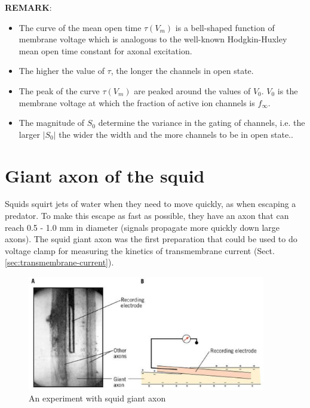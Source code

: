 {\bf REMARK}:
\begin{itemize}

\item The curve of the mean open time $\tau(V_m)$ is a bell-shaped
  function of membrane voltage which is analogous to the well-known
  Hodgkin-Huxley mean open time constant for axonal excitation.

\item The higher the value of $\tau$, the longer the channels in open
  state.

\item The peak of the curve $\tau(V_m)$ are peaked around the values
  of $V_0$. $V_0$ is the membrane voltage at which the fraction of
  active ion channels is $f_\infty$.

\item The magnitude of $S_0$ determine the variance in the gating of
  channels, i.e. the larger $|S_0|$ the wider the width and the more
  channels to be in open state..
\end{itemize}

\section{Giant axon of the squid}
\label{sec:squid-giant-axon}

Squids squirt jets of water when they need to move quickly, as when escaping a
predator. To make this escape as fast as possible, they have an axon that can
reach 0.5 - 1.0 mm in diameter (signals propagate more quickly down large
axons). The squid giant axon was the first preparation that could be used to
do voltage clamp for measuring the kinetics of transmembrane current
(Sect.\ref{sec:transmembrane-current}).


\begin{figure}[hbt]
  \centerline{\includegraphics[height=5cm,
    angle=0]{./images/giant_axon.eps}}
  \caption{An experiment with squid giant axon}
  \label{fig:giant_axon}
\end{figure}

